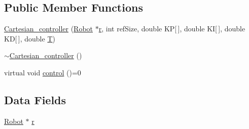 \subsection*{Public Member Functions}
\begin{DoxyCompactItemize}
\item 
\hyperlink{classCartesian__controller_a71055bb1cbf01ced9e64bb1d184b68fe}{Cartesian\-\_\-controller} (\hyperlink{structRobot}{Robot} $\ast$\hyperlink{classCartesian__controller_a5562129951bd802e4ded77fc716c87a0}{r}, int ref\-Size, double K\-P\mbox{[}$\,$\mbox{]}, double K\-I\mbox{[}$\,$\mbox{]}, double K\-D\mbox{[}$\,$\mbox{]}, double \hyperlink{classCartesian__controller_a35c6ddbb9624878f2807ff644a33e832}{T})
\item 
\hyperlink{classCartesian__controller_ac29863d92d56a5998ba39ddb58f4a09e}{$\sim$\-Cartesian\-\_\-controller} ()
\item 
virtual void \hyperlink{classCartesian__controller_a8809167cab6d338a957439141fa2bf6c}{control} ()=0
\end{DoxyCompactItemize}
\subsection*{Data Fields}
\begin{DoxyCompactItemize}
\item 
\hyperlink{structRobot}{Robot} $\ast$ \hyperlink{classCartesian__controller_a5562129951bd802e4ded77fc716c87a0}{r}
\end{DoxyCompactItemize}
